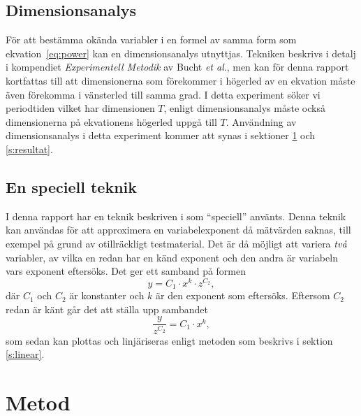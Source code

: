 \documentclass[a4paper]{article}
\begin{document}
\subsection{Dimensionsanalys}\label{s:dimension}

För att bestämma okända variabler i en formel av samma form som ekvation~\ref{eq:power} kan en dimensionsanalys utnyttjas. Tekniken beskrivs i detalj i kompendiet \textit{Experimentell Metodik} av Bucht \textit{et al}.\cite{Compendium}, men kan för denna rapport kortfattas till att dimensionerna som förekommer i högerled av en ekvation måste även förekomma i vänsterled till samma grad. I detta experiment söker vi periodtiden vilket har dimensionen $T$, enligt dimensionsanalys måste också dimensionerna på ekvationens högerled uppgå till $T$. Användning av dimensionsanalys i detta experiment kommer att synas i sektioner \ref{s:metod} och \ref{s:resultat}.

\subsection{En speciell teknik}\label{s:special}

I denna rapport har en teknik beskriven i \cite{Compendium} som ``speciell'' använts. Denna teknik kan användas för att approximera en variabelexponent då mätvärden saknas, till exempel på grund av otillräckligt testmaterial. Det är då möjligt att variera \textit{två} variabler, av vilka en redan har en känd exponent och den andra är variabeln vars exponent eftersöks. Det ger ett samband på formen
\begin{equation}
    y = C_1 \cdot x^k \cdot z^{C_2},
\end{equation}
%
där $C_1$ och $C_2$ är konstanter och $k$ är den exponent som eftersöks. Eftersom $C_2$ redan är känt går det att ställa upp sambandet
\begin{equation}
    \frac {y}{z^{C_2}} = C_1 \cdot x^k ,
\end{equation}
%
som sedan kan plottas och linjäriseras enligt metoden som beskrivs i sektion \ref{s:linear}.

\newpage
\section{Metod}\label{s:metod}
\end{document}
